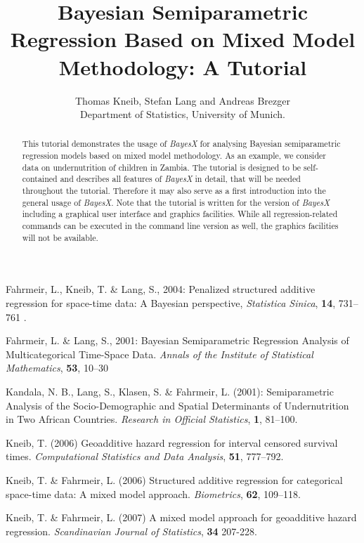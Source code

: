 \documentclass[a4paper]{article}
\begin{document}
\title{Bayesian Semiparametric Regression Based on Mixed Model Methodology: A Tutorial}
\author{Thomas Kneib, Stefan Lang and Andreas Brezger\\ [.25cm]
\normalsize Department of Statistics, University of Munich. } \maketitle

\begin{abstract}
This tutorial demonstrates the usage of {\it BayesX} for analysing Bayesian semiparametric regression models based on mixed
model methodology. As an example, we consider data on undernutrition of children in Zambia. The tutorial is designed to be
self-contained and describes all features of {\it BayesX} in detail, that will be needed throughout the tutorial. Therefore it
may also serve as a first introduction into the general usage of {\it BayesX}. Note that the tutorial is written for the
version of {\it BayesX} including a graphical user interface and graphics facilities. While all regression-related commands can
be executed in the command line version as well, the graphics facilities will not be available.
\end{abstract}

\tableofcontents

\newpage




\begin{thebibliography}{99}
 Fahrmeir, L., Kneib, T. \& Lang, S., 2004: Penalized structured additive
regression for space-time data: A Bayesian perspective, {\it Statistica Sinica}, {\bf 14}, 731--761 .

 Fahrmeir, L. \& Lang, S., 2001: Bayesian Semiparametric Regression Analysis of
Multicategorical Time-Space Data. {\it Annals of the Institute of Statistical Mathematics}, {\bf 53}, 10--30

 Kandala, N. B., Lang, S., Klasen, S. \& Fahrmeir, L. (2001): Semiparametric
Analysis of the Socio-Demographic and Spatial Determinants of Undernutrition in Two African Countries. {\it Research in
Official Statistics}, {\bf 1}, 81--100.

  {Kneib, T.} (2006) Geoadditive hazard regression for interval censored
 survival times. {\it Computational Statistics and Data Analysis}, {\bf 51}, 777--792.

  {Kneib, T. \& Fahrmeir, L.} (2006) Structured additive
 regression for categorical space-time data: A mixed model approach. {\it Biometrics}, {\bf 62}, 109--118.

  {Kneib, T. \& Fahrmeir, L.} (2007) A mixed model approach for
 geoadditive hazard regression. {\it Scandinavian Journal of Statistics}, {\bf 34} 207-228.


\end{thebibliography}
\end{document}
